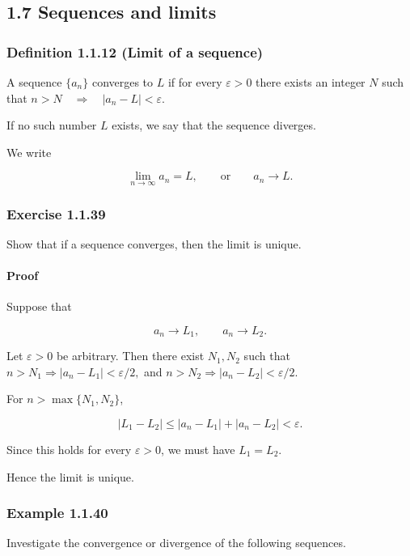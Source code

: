 \documentclass[11pt,a4paper]{article}
\begin{document}
\subsection{1.7 Sequences and limits}\label{sequences-and-limits}

\subsubsection{Definition 1.1.12 (Limit of a
sequence)}\label{definition-1.1.12-limit-of-a-sequence}

A sequence \(\{a_n\}\) converges to \(L\) if for every \(\varepsilon>0\)
there exists an integer \(N\) such that
\(n>N \quad\Longrightarrow\quad |a_n-L|<\varepsilon.\)

If no such number \(L\) exists, we say that the sequence diverges.

We write

\[
\lim_{n\to\infty}a_n=L,
\qquad\text{or}\qquad a_n\to L.
\]

\subsubsection{Exercise 1.1.39}\label{exercise-1.1.39}

Show that if a sequence converges, then the limit is unique.

\paragraph{Proof}\label{proof-1}

Suppose that

\[
a_n\to L_1,
\qquad a_n\to L_2.
\]

Let \(\varepsilon>0\) be arbitrary. Then there exist \(N_1,N_2\) such
that \(n>N_1 \Rightarrow |a_n-L_1|<\varepsilon/2,\) and
\(n>N_2 \Rightarrow |a_n-L_2|<\varepsilon/2.\)

For \(n>\max\{N_1,N_2\}\),

\[
|L_1-L_2|
\le |a_n-L_1|+|a_n-L_2|
< \varepsilon.
\]

Since this holds for every \(\varepsilon>0\), we must have \(L_1=L_2\).

Hence the limit is unique.

\subsubsection{Example 1.1.40}\label{example-1.1.40}

Investigate the convergence or divergence of the following sequences.
\end{document}
